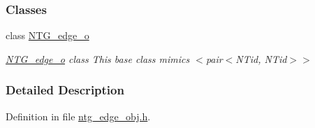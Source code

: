 \subsubsection*{Classes}
\begin{DoxyCompactItemize}
\item 
class \hyperlink{class_n_t_g__edge__o}{NTG\_\-edge\_\-o}
\begin{DoxyCompactList}\small\item\em \hyperlink{class_n_t_g__edge__o}{NTG\_\-edge\_\-o} class This base class mimics $<$pair$<$NTid, NTid$>$$>$ \item\end{DoxyCompactList}\end{DoxyCompactItemize}


\subsubsection{Detailed Description}


Definition in file \hyperlink{ntg__edge__obj_8h_source}{ntg\_\-edge\_\-obj.h}.

